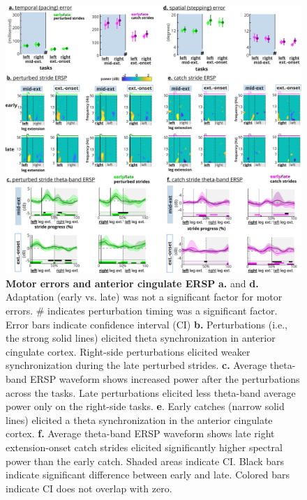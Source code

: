 \documentclass[../thesis_seyed.tex]{subfiles}
\begin{document}
\begin{figure}[H]
    \centerline{\includegraphics[width=\linewidth]{../img/hyp1and2-fdr.jpg}}
    \caption{\textbf{Motor errors and anterior cingulate ERSP} \textbf{a.} and \textbf{d.} Adaptation (early vs. late) was not a significant factor for motor errors. \# indicates perturbation timing was a significant factor. Error bars indicate confidence interval (CI) \textbf{b.} Perturbations (i.e., the strong solid lines) elicited theta synchronization in anterior cingulate cortex. Right-side perturbations elicited weaker synchronization during the late perturbed strides. \textbf{c.} Average theta-band ERSP waveform shows increased power after the perturbations across the tasks. Late perturbations elicited less theta-band average power only on the right-side tasks. \textbf{e}. Early catches (narrow solid lines) elicited a theta synchronization in the anterior cingulate cortex. \textbf{f.} Average theta-band ERSP waveform shows late right extension-onset catch strides elicited significantly higher spectral power than the early catch. Shaded areas indicate CI. Black bars indicate significant difference between early and late. Colored bars indicate CI does not overlap with zero.}
    \label{fig:fig6}
    \end{figure}
\end{document}
